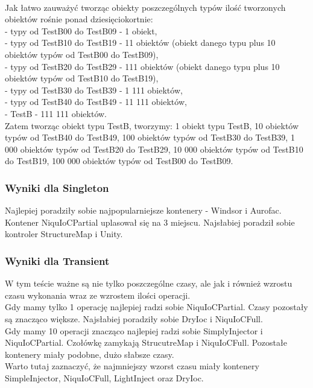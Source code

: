 \documentclass[12pt]{article}
\begin{document}
\\
Jak łatwo zauważyć tworząc obiekty poszczególnych typów ilość tworzonych obiektów rośnie ponad dziesięciokortnie:\\
- typy od TestB00 do TestB09 - 1 obiekt,\\
- typy od TestB10 do TestB19 - 11 obiektów (obiekt danego typu plus 10 obiektów typów od TestB00 do TestB09),\\
- typy od TestB20 do TestB29 - 111 obiektów (obiekt danego typu plus 10 obiektów typów od TestB10 do TestB19),\\
- typy od TestB30 do TestB39 - 1 111 obiektów,\\
- typy od TestB40 do TestB49 - 11 111 obiektów,\\
- TestB - 111 111 obiektów.\\
Zatem tworząc obiekt typu TestB, tworzymy: 1 obiekt typu TestB, 10 obiektów typów od TestB40 do TestB49, 100 obiektów typów od TestB30 do TestB39, 1 000 obiektów typów od TestB20 do TestB29, 10 000 obiektów typów od TestB10 do TestB19, 100 000 obiektów typów od TestB00 do TestB09.

\subsubsection{Wyniki dla Singleton}
Najlepiej poradziły sobie najpopularniejsze kontenery - Windsor i Aurofac. Kontener NiquIoCPartial uplasował się na 3 miejscu. Najsłabiej poradził sobie kontroler StructureMap i Unity.

\subsubsection{Wyniki dla Transient}
W tym teście ważne są nie tylko poszczególne czasy, ale jak i również wzrostu czasu wykonania wraz ze wzrostem ilości operacji.\\
Gdy mamy tylko 1 operację najlepiej radzi sobie NiquIoCPartial. Czasy pozostały są znacząco większe. Najsłabiej poradziły sobie DryIoc i NiquIoCFull.\\
Gdy mamy 10 operacji znacząco najlepiej radzi sobie SimplyInjector i NiquIoCPartial. Czołówkę zamykają StrucutreMap i NiquIoCFull. Pozostałe kontenery miały podobne, dużo słabsze czasy.\\
Warto tutaj zaznaczyć, że najmniejszy wzorst czasu miały kontenery SimpleInjector, NiquIoCFull, LightInject oraz DryIoc.
\end{document}
